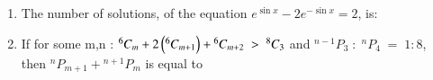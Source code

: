 \documentclass[journal,,12pt,onecolumn]{IEEEtran}
\theoremstyle{remark}
\begin{document}
\begin{enumerate}
\begin{enumerate}
\end{enumerate}
\bigskip
\item The number of solutions, of the equation $e^{\sin{x}}-2e^{-\sin{x}}=2$, is:
\begin{enumerate}
\end{enumerate}
\bigskip
\item If for some m,n : ${}^{6}C_{m}+2\left({}^{6}C_{m+1}\right)+{}^{6}C_{m+2}\;>\; {}^{8}C_{3}$ and ${}^{n-1}P_{3}\;:\;{}^{n}P_{4}\;=\;1:8$, then ${}^{n}P_{m+1}+{}^{n+1}P_{m}$ is equal to
\begin{enumerate}
\end{enumerate}
 \end{enumerate}
 \bigskip

 
\end{document}
